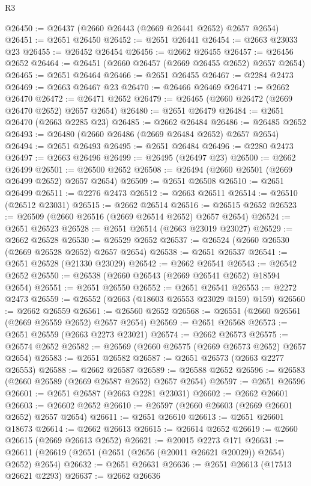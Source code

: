 \begin{lexlean}{R3}
\begin{coremodule}
@26450 := @26437 (@2660 @26443 (@2669 @26441 @2652) @2657 @2654)
@26451 := @2651 @26450
@26452 := @2651 @26441
@26454 := @2663 @23033 @23
@26455 := @26452 @26454
@26456 := @2662 @26455
@26457 := @26456 @2652
@26464 := @26451 (@2660 @26457 (@2669 @26455 @2652) @2657 @2654)
@26465 := @2651 @26464
@26466 := @2651 @26455
@26467 := @2284 @2473
@26469 := @2663 @26467 @23
@26470 := @26466 @26469
@26471 := @2662 @26470
@26472 := @26471 @2652
@26479 := @26465 (@2660 @26472 (@2669 @26470 @2652) @2657 @2654)
@26480 := @2651 @26479
@26484 := @2651 @26470 (@2663 @2285 @23)
@26485 := @2662 @26484
@26486 := @26485 @2652
@26493 := @26480 (@2660 @26486 (@2669 @26484 @2652) @2657 @2654)
@26494 := @2651 @26493
@26495 := @2651 @26484
@26496 := @2280 @2473
@26497 := @2663 @26496
@26499 := @26495 (@26497 @23)
@26500 := @2662 @26499
@26501 := @26500 @2652
@26508 := @26494 (@2660 @26501 (@2669 @26499 @2652) @2657 @2654)
@26509 := @2651 @26508
@26510 := @2651 @26499
@26511 := @2276 @2473
@26512 := @2663 @26511
@26514 := @26510 (@26512 @23031)
@26515 := @2662 @26514
@26516 := @26515 @2652
@26523 := @26509 (@2660 @26516 (@2669 @26514 @2652) @2657 @2654)
@26524 := @2651 @26523
@26528 := @2651 @26514 (@2663 @23019 @23027)
@26529 := @2662 @26528
@26530 := @26529 @2652
@26537 := @26524 (@2660 @26530 (@2669 @26528 @2652) @2657 @2654)
@26538 := @2651 @26537
@26541 := @2651 @26528 (@21330 @23029)
@26542 := @2662 @26541
@26543 := @26542 @2652
@26550 := @26538 (@2660 @26543 (@2669 @26541 @2652) @18594 @2654)
@26551 := @2651 @26550
@26552 := @2651 @26541
@26553 := @2272 @2473
@26559 := @26552 (@2663 (@18603 @26553 @23029 @159) @159)
@26560 := @2662 @26559
@26561 := @26560 @2652
@26568 := @26551 (@2660 @26561 (@2669 @26559 @2652) @2657 @2654)
@26569 := @2651 @26568
@26573 := @2651 @26559 (@2663 @2273 @23021)
@26574 := @2662 @26573
@26575 := @26574 @2652
@26582 := @26569 (@2660 @26575 (@2669 @26573 @2652) @2657 @2654)
@26583 := @2651 @26582
@26587 := @2651 @26573 (@2663 @2277 @26553)
@26588 := @2662 @26587
@26589 := @26588 @2652
@26596 := @26583 (@2660 @26589 (@2669 @26587 @2652) @2657 @2654)
@26597 := @2651 @26596
@26601 := @2651 @26587 (@2663 @2281 @23031)
@26602 := @2662 @26601
@26603 := @26602 @2652
@26610 := @26597 (@2660 @26603 (@2669 @26601 @2652) @2657 @2654)
@26611 := @2651 @26610
@26613 := @2651 @26601 @18673
@26614 := @2662 @26613
@26615 := @26614 @2652
@26619 := @2660 @26615 (@2669 @26613 @2652)
@26621 := @20015 @2273 @171
@26631 := @26611 (@26619 (@2651 (@2651 (@2656 (@20011 @26621 @20029)) @2654) @2652) @2654)
@26632 := @2651 @26631
@26636 := @2651 @26613 (@17513 @26621 @2293)
@26637 := @2662 @26636

\end{coremodule}
\end{lexlean}
